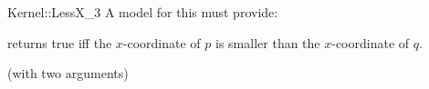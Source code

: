 \begin{ccRefFunctionObjectConcept}{Kernel::LessX_3}
A model for this must provide:


{returns true iff the $x$-coordinate of $p$ is smaller than the
$x$-coordinate of $q$.}

\ccRefines
{} (with two arguments)

\ccSeeAlso
{}\\

\end{ccRefFunctionObjectConcept}
